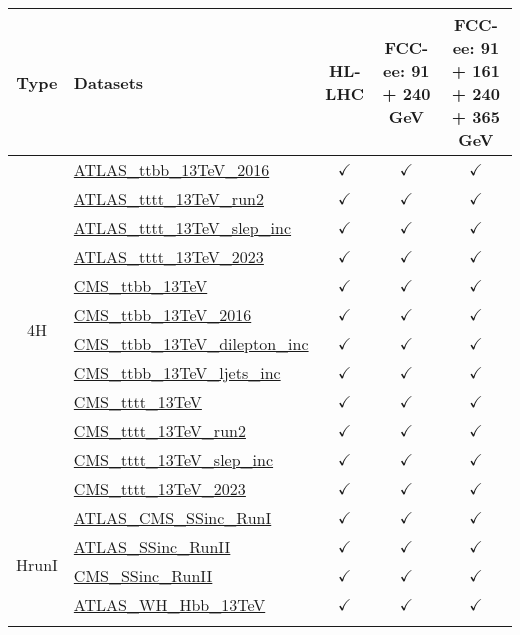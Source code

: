 \documentclass{article}
\begin{document}
\begin{longtable}{|c|l|c|c|c|}
\hline
\footnotesize
 Type & Datasets  & HL-LHC & FCC-ee: 91 + 240 GeV & FCC-ee: 91 + 161 + 240 + 365 GeV \\ \hline
\multirow{12}{*}{4H}
 & \href{https://arxiv.org}{ATLAS_ttbb_13TeV_2016}  & $\checkmark$ & $\checkmark$ & $\checkmark$\\ \cline{2-5}
 & \href{https://arxiv.org}{ATLAS_tttt_13TeV_run2}  & $\checkmark$ & $\checkmark$ & $\checkmark$\\ \cline{2-5}
 & \href{https://arxiv.org}{ATLAS_tttt_13TeV_slep_inc}  & $\checkmark$ & $\checkmark$ & $\checkmark$\\ \cline{2-5}
 & \href{https://arxiv.org}{ATLAS_tttt_13TeV_2023}  & $\checkmark$ & $\checkmark$ & $\checkmark$\\ \cline{2-5}
 & \href{https://arxiv.org}{CMS_ttbb_13TeV}  & $\checkmark$ & $\checkmark$ & $\checkmark$\\ \cline{2-5}
 & \href{https://arxiv.org}{CMS_ttbb_13TeV_2016}  & $\checkmark$ & $\checkmark$ & $\checkmark$\\ \cline{2-5}
 & \href{https://arxiv.org}{CMS_ttbb_13TeV_dilepton_inc}  & $\checkmark$ & $\checkmark$ & $\checkmark$\\ \cline{2-5}
 & \href{https://arxiv.org}{CMS_ttbb_13TeV_ljets_inc}  & $\checkmark$ & $\checkmark$ & $\checkmark$\\ \cline{2-5}
 & \href{https://arxiv.org}{CMS_tttt_13TeV}  & $\checkmark$ & $\checkmark$ & $\checkmark$\\ \cline{2-5}
 & \href{https://arxiv.org}{CMS_tttt_13TeV_run2}  & $\checkmark$ & $\checkmark$ & $\checkmark$\\ \cline{2-5}
 & \href{https://arxiv.org}{CMS_tttt_13TeV_slep_inc}  & $\checkmark$ & $\checkmark$ & $\checkmark$\\ \cline{2-5}
 & \href{https://arxiv.org}{CMS_tttt_13TeV_2023}  & $\checkmark$ & $\checkmark$ & $\checkmark$
\\ \hline
\multirow{10}{*}{HrunI}
 & \href{https://arxiv.org}{ATLAS_CMS_SSinc_RunI}  & $\checkmark$ & $\checkmark$ & $\checkmark$\\ \cline{2-5}
 & \href{https://arxiv.org}{ATLAS_SSinc_RunII}  & $\checkmark$ & $\checkmark$ & $\checkmark$\\ \cline{2-5}
 & \href{https://arxiv.org}{CMS_SSinc_RunII}  & $\checkmark$ & $\checkmark$ & $\checkmark$\\ \cline{2-5}
 & \href{https://arxiv.org}{ATLAS_WH_Hbb_13TeV}  & $\checkmark$ & $\checkmark$ & $\checkmark$\\ \cline{2-5}

\end{longtable}
\end{document}
